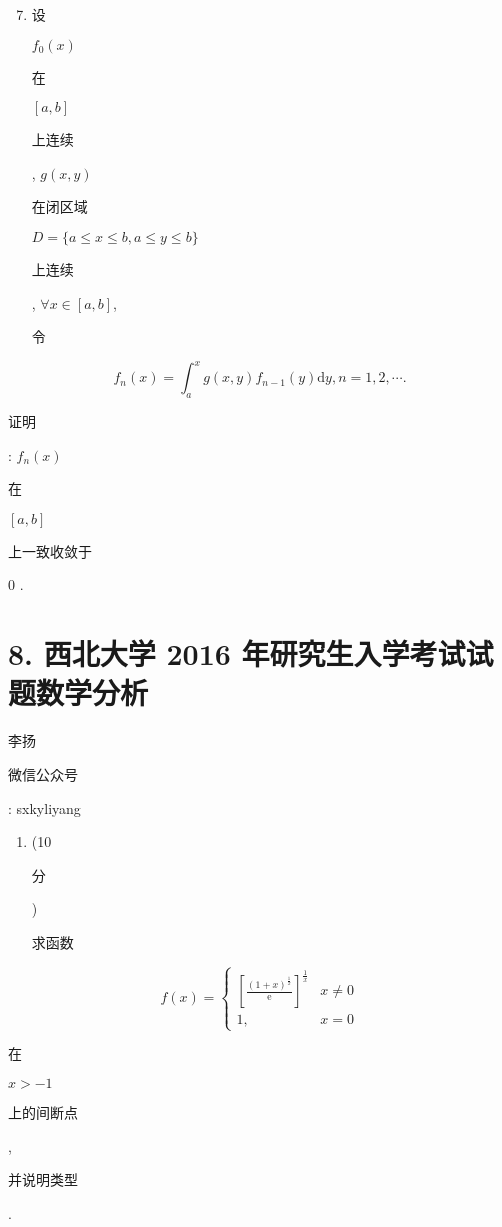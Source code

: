 \documentclass[10pt]{article}
\begin{document}
\begin{enumerate}
  \setcounter{enumi}{6}
  \item \begin{CJK}{UTF8}{mj}设\end{CJK} $f_{0}(x)$ \begin{CJK}{UTF8}{mj}在\end{CJK} $[a, b]$ \begin{CJK}{UTF8}{mj}上连续\end{CJK}, $g(x, y)$ \begin{CJK}{UTF8}{mj}在闭区域\end{CJK} $D=\{a \leq x \leq b, a \leq y \leq b\}$ \begin{CJK}{UTF8}{mj}上连续\end{CJK}, $\forall x \in[a, b]$, \begin{CJK}{UTF8}{mj}令\end{CJK}
\end{enumerate}
$$
f_{n}(x)=\int_{a}^{x} g(x, y) f_{n-1}(y) \mathrm{d} y, n=1,2, \cdots .
$$
\begin{CJK}{UTF8}{mj}证明\end{CJK}: $f_{n}(x)$ \begin{CJK}{UTF8}{mj}在\end{CJK} $[a, b]$ \begin{CJK}{UTF8}{mj}上一致收敛于\end{CJK} 0 .

\section{8. 西北大学 2016 年研究生入学考试试题数学分析}
\begin{CJK}{UTF8}{mj}李扬\end{CJK}

\begin{CJK}{UTF8}{mj}微信公众号\end{CJK}: sxkyliyang

\begin{enumerate}
  \item (10 \begin{CJK}{UTF8}{mj}分\end{CJK}) \begin{CJK}{UTF8}{mj}求函数\end{CJK}
\end{enumerate}
$$
f(x)= \begin{cases}{\left[\frac{(1+x)^{\frac{1}{x}}}{\mathrm{e}}\right]^{\frac{1}{x}}} & x \neq 0 \\ 1, & x=0\end{cases}
$$
\begin{CJK}{UTF8}{mj}在\end{CJK} $x>-1$ \begin{CJK}{UTF8}{mj}上的间断点\end{CJK}, \begin{CJK}{UTF8}{mj}并说明类型\end{CJK}.
\end{document}

